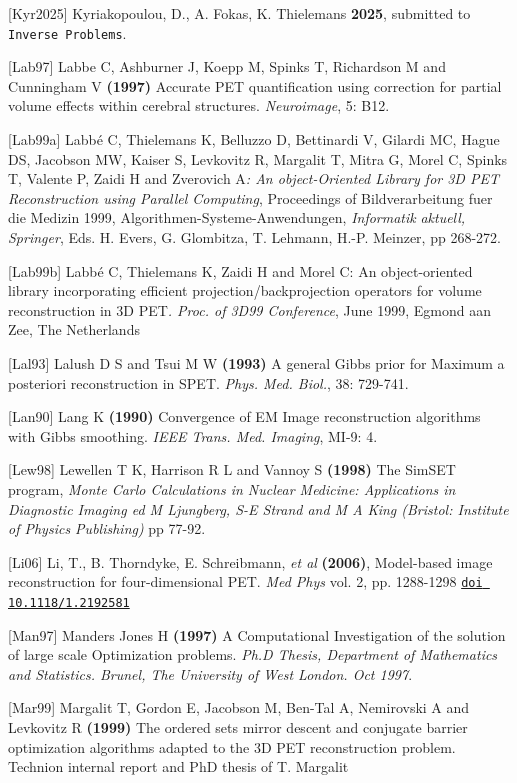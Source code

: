 \documentclass{article}
\def\url#1#2{\mbox{\href{#1}{\tt #2}}}
\begin{document}
{{{{{{[Kyr2025]
Kyriakopoulou, D., A. Fokas, K. Thielemans \textbf{2025}, submitted to \texttt{Inverse Problems}.

{[}Lab97] Labbe C, Ashburner J, Koepp M, Spinks T, Richardson M 
and Cunningham V \textbf{(1997)} Accurate PET quantification using 
correction for partial volume effects within cerebral structures. \textit{Neuroimage}, 
5: B12.


{[}Lab99a] Labb\'{e} C, Thielemans K, Belluzzo D, Bettinardi V, Gilardi 
MC, Hague DS, Jacobson MW, Kaiser S, Levkovitz R, Margalit T, 
Mitra G, Morel C, Spinks T, Valente P, Zaidi H and Zverovich A\textit{: 
An object-Oriented Library for 3D PET Reconstruction using Parallel 
Computing}, Proceedings of Bildverarbeitung fuer die Medizin 
1999, Algorithmen-Systeme-Anwendungen, \textit{Informatik} 
\textit{aktuell, Springer}, Eds. H. Evers, G. Glombitza, T. Lehmann, 
H.-P. Meinzer, pp 268-272. 

{[}Lab99b] Labb\'{e} C, Thielemans K, Zaidi H and Morel C: An object-oriented 
library incorporating efficient projection/backprojection operators 
for volume reconstruction in 3D PET\textit{. Proc. of 3D99 Conference}, 
June 1999, Egmond aan Zee, The Netherlands 


{[}Lal93] Lalush D S and Tsui M W \textbf{(1993)} A general Gibbs prior 
for Maximum a posteriori reconstruction in SPET. \textit{Phys. Med. 
Biol.}, 38: 729-741.

{[}Lan90] Lang K \textbf{(1990)} Convergence of EM Image reconstruction 
algorithms with Gibbs smoothing. \textit{IEEE Trans. Med. Imaging}, 
MI-9: 4.

{[}Lew98] Lewellen T K, Harrison R L and Vannoy S \textbf{(1998)} 
The SimSET program,
\textit{ Monte Carlo Calculations in Nuclear Medicine:
Applications in Diagnostic Imaging ed M Ljungberg, S-E Strand and M A King (Bristol: Institute of Physics
Publishing)} pp 77-92.

[Li06] Li, T., B. Thorndyke, E.
Schreibmann, \textit{et al} \textbf{(2006)}, Model-based image reconstruction for
four-dimensional PET. \textit{Med Phys} vol. 2, pp. 1288-1298
\url{http://link.aip.org/link/doi/10.1118/1.2192581}{doi 10.1118/1.2192581}

{[}Man97] Manders Jones H \textbf{(1997)} A Computational Investigation 
of the solution of large scale Optimization problems. \textit{Ph.D 
Thesis, Department of Mathematics and Statistics. Brunel, The 
University of West London. Oct 1997}.


{[}Mar99] Margalit T, Gordon E, Jacobson M, Ben-Tal A, Nemirovski 
A and Levkovitz R \textbf{(1999)} The ordered sets mirror descent and 
conjugate barrier optimization algorithms adapted to the 3D PET 
reconstruction problem. Technion internal report and PhD thesis of T. Margalit

}}}}}}
\end{document}
